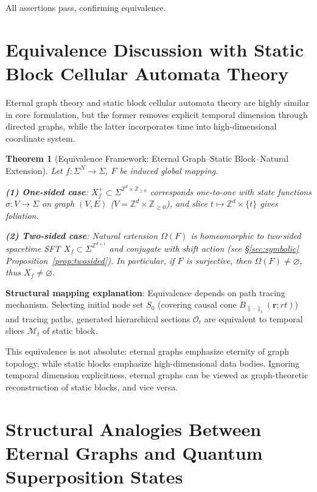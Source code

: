 \documentclass[11pt]{article}
\newtheorem{theorem}{Theorem}[section]
\theoremstyle{definition}
\theoremstyle{remark}
\begin{document}
All assertions pass, confirming equivalence.

\section{Equivalence Discussion with Static Block Cellular Automata Theory}\label{sec:equivalence}

Eternal graph theory and static block cellular automata theory are highly similar in core formulation, but the former removes explicit temporal dimension through directed graphs, while the latter incorporates time into high-dimensional coordinate system.

\begin{theorem}[Equivalence Framework: Eternal Graph--Static Block--Natural Extension]\label{thm:equivalence}
Let \( f:\Sigma^N\to\Sigma \), \( F \) be induced global mapping.

\textbf{(1) One-sided case}: \( X_f^+\subset\Sigma^{\mathbb Z^d\times\mathbb Z_{\ge0}} \) corresponds one-to-one with state functions \( \sigma:V\to\Sigma \) on graph \( (V,E) \) (\( V=\mathbb Z^d\times\mathbb Z_{\ge0} \)), and slice \( t\mapsto \mathbb Z^d\times\{t\} \) gives foliation.

\textbf{(2) Two-sided case}: Natural extension \( \Omega(F) \) is homeomorphic to two-sided spacetime SFT \( X_f\subset\Sigma^{\mathbb Z^{d+1}} \) and conjugate with shift action (see §\ref{sec:symbolic} Proposition~\ref{prop:twosided}). In particular, if \( F \) is surjective, then \( \Omega(F)\neq\varnothing \), thus \( X_f\neq\varnothing \).
\end{theorem}

\textbf{Structural mapping explanation}: Equivalence depends on path tracing mechanism. Selecting initial node set \( S_0 \) (covering causal cone \( B_{\|\cdot\|_1}(\mathbf{r}; r t) \)) and tracing paths, generated hierarchical sections \( \mathcal{O}_t \) are equivalent to temporal slices \( \mathcal{M}_t \) of static block.

This equivalence is not absolute: eternal graphs emphasize eternity of graph topology, while static blocks emphasize high-dimensional data bodies. Ignoring temporal dimension explicitness, eternal graphs can be viewed as graph-theoretic reconstruction of static blocks, and vice versa.

\section{Structural Analogies Between Eternal Graphs and Quantum Superposition States}\label{sec:quantum}
\end{document}
